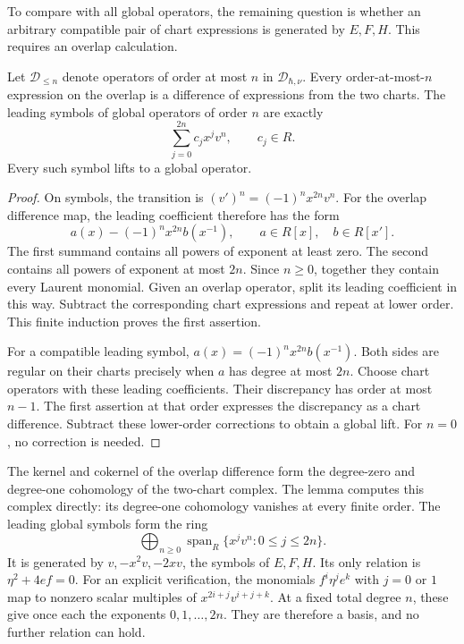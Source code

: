 To compare with all global operators, the remaining question is whether an arbitrary compatible pair of chart expressions is generated by $E,F,H$.
This requires an overlap calculation.

\begin{lemma}\label{lem:qc-laurent-splitting}
Let $\mathcal D_{\le n}$ denote operators of order at most $n$ in $\mathcal D_{\hbar,\nu}$.
Every order-at-most-$n$ expression on the overlap is a difference of expressions from the two charts.
The leading symbols of global operators of order $n$ are exactly
\[
 \sum_{j=0}^{2n}c_j x^j v^n,\qquad c_j\in R.
\]
Every such symbol lifts to a global operator.
\end{lemma}
\begin{proof}
On symbols, the transition is $(v')^n=(-1)^n x^{2n}v^n$.
For the overlap difference map, the leading coefficient therefore has the form
\[
 a(x)-(-1)^n x^{2n}b(x^{-1}),\qquad
 a\in R[x],\quad b\in R[x'].
\]
The first summand contains all powers of exponent at least zero.
The second contains all powers of exponent at most $2n$.
Since $n\ge0$, together they contain every Laurent monomial.
Given an overlap operator, split its leading coefficient in this way.
Subtract the corresponding chart expressions and repeat at lower order.
This finite induction proves the first assertion.

For a compatible leading symbol, $a(x)=(-1)^n x^{2n}b(x^{-1})$.
Both sides are regular on their charts precisely when $a$ has degree at most $2n$.
Choose chart operators with these leading coefficients.
Their discrepancy has order at most $n-1$.
The first assertion at that order expresses the discrepancy as a chart difference.
Subtract these lower-order corrections to obtain a global lift.
For $n=0$, no correction is needed.
\end{proof}

The kernel and cokernel of the overlap difference form the degree-zero and degree-one cohomology of the two-chart complex.
The lemma computes this complex directly: its degree-one cohomology vanishes at every finite order.
The leading global symbols form the ring
\[
 \bigoplus_{n\ge0}\operatorname{span}_R\{x^jv^n:0\le j\le2n\}.
\]
It is generated by $v,-x^2v,-2xv$, the symbols of $E,F,H$.
Its only relation is $\eta^2+4ef=0$.
For an explicit verification, the monomials $f^i\eta^j e^k$ with $j=0$ or $1$ map to nonzero scalar multiples of
$x^{2i+j}v^{i+j+k}$.
At a fixed total degree $n$, these give once each the exponents $0,1,\ldots,2n$.
They are therefore a basis, and no further relation can hold.


